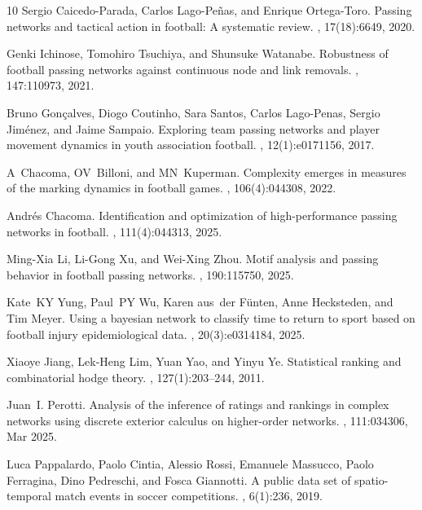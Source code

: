 \documentclass[preprint,12pt]{elsarticle}
\begin{document}
\begin{thebibliography}{10}
Sergio Caicedo-Parada, Carlos Lago-Pe{\~n}as, and Enrique Ortega-Toro.
\newblock Passing networks and tactical action in football: A systematic
  review.
, 17(18):6649, 2020.

Genki Ichinose, Tomohiro Tsuchiya, and Shunsuke Watanabe.
\newblock Robustness of football passing networks against continuous node and
  link removals.
, 147:110973, 2021.

Bruno Gon{\c{c}}alves, Diogo Coutinho, Sara Santos, Carlos Lago-Penas, Sergio
  Jim{\'e}nez, and Jaime Sampaio.
\newblock Exploring team passing networks and player movement dynamics in youth
  association football.
, 12(1):e0171156, 2017.

A~Chacoma, OV~Billoni, and MN~Kuperman.
\newblock Complexity emerges in measures of the marking dynamics in football
  games.
, 106(4):044308, 2022.

Andr{\'e}s Chacoma.
\newblock Identification and optimization of high-performance passing networks
  in football.
, 111(4):044313, 2025.

Ming-Xia Li, Li-Gong Xu, and Wei-Xing Zhou.
\newblock Motif analysis and passing behavior in football passing networks.
, 190:115750, 2025.

Kate~KY Yung, Paul~PY Wu, Karen aus~der F{\"u}nten, Anne Hecksteden, and Tim
  Meyer.
\newblock Using a bayesian network to classify time to return to sport based on
  football injury epidemiological data.
, 20(3):e0314184, 2025.

Xiaoye Jiang, Lek-Heng Lim, Yuan Yao, and Yinyu Ye.
\newblock Statistical ranking and combinatorial hodge theory.
, 127(1):203--244, 2011.

Juan~I. Perotti.
\newblock Analysis of the inference of ratings and rankings in complex networks
  using discrete exterior calculus on higher-order networks.
, 111:034306, Mar 2025.

Luca Pappalardo, Paolo Cintia, Alessio Rossi, Emanuele Massucco, Paolo
  Ferragina, Dino Pedreschi, and Fosca Giannotti.
\newblock A public data set of spatio-temporal match events in soccer
  competitions.
, 6(1):236, 2019.


\end{thebibliography}
\end{document}
